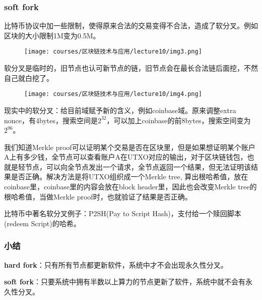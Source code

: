 \documentclass[10pt]{ctexart}
\begin{document}
\subsubsection{soft fork}
比特币协议中加一些限制，使得原来合法的交易变得不合法，造成了软分叉。例如区块的大小限制1M变为0.5M。
\begin{figure}[H]
    \centering
    \texttt{[image: courses/区块链技术与应用/lecture10/img3.png]} 
\end{figure}
软分叉是临时的，旧节点也认可新节点的链，旧节点会在最长合法链后面挖，不然自己就白挖了。
\begin{figure}[H]
    \centering
    \texttt{[image: courses/区块链技术与应用/lecture10/img4.png]} 
\end{figure}
现实中的软分叉：给目前域赋予新的含义，例如coinbase域。原来调整extra nonce，有4bytes，搜索空间是$2^{32}$，可以加上coinbase的前8bytes，搜索空间变为$2^{96}$。

我们知道Merkle proof可以证明某个交易是否在区块里，但是如果想证明某个账户A上有多少钱，全节点可以查看账户A在UTXO对应的输出，对于区块链钱包，也就是轻节点，可以向全节点发出一个请求，全节点返回一个结果，但无法证明该结果是否正确。解决方法是将UTXO组织成一个Merkle tree, 算出根哈希值，放在coinbase里，coinbase里的内容会放在block header里，因此也会改变Merkle tree的根哈希值，当做Merkle proof时，也就验证了结果是否正确。

比特币中著名软分叉例子：P2SH(Pay to Script Hash)，支付给一个赎回脚本(redeem Script)的哈希。
\subsubsection{小结}
\textbf{hard fork}：只有所有节点都更新软件，系统中才不会出现永久性分叉。

\textbf{soft fork}：只要系统中拥有半数以上算力的节点更新了软件，系统中就不会有永久性分叉。
\end{document}
